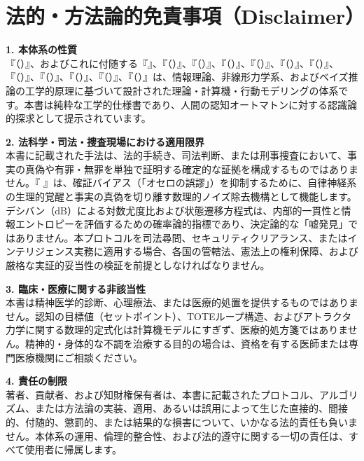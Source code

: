 \ifja
    \chapter*{法的・方法論的免責事項（Disclaimer）}
    \noindent
    \textbf{1. 本体系の性質}\\
    『\fullSNLP（\abbrSNLP）』、およびこれに付随する『\fullOthelloFilter』、『\fullOIP（\abbrOIP）』、『\fullBTP（\abbrBTP）』、『\fullBV（\abbrBV）』、『\fullBDLL（\abbrBDLL）』、『\fullSBFT（\abbrSBFT）』、『\fullTRPSH（\abbrTRPSH）』、『\fullBHPPP（\abbrBHPPP）』、『\fullUUSTT（\abbrUUSTT）』、『\fullRCSMIT（\abbrRCSMIT）』、『\fullFTHBFT（\abbrFTHBFT）』、『\fullMBCR（\abbrMBCR）』は、情報理論、非線形力学系、およびベイズ推論の工学的原理に基づいて設計された理論・計算機・行動モデリングの体系です。本書は純粋な工学的仕様書であり、人間の認知オートマトンに対する認識論的探求として提示されています。

    \vspace{0.8em}
    \noindent
    \textbf{2. 法科学・司法・捜査現場における適用限界}\\
    本書に記載された手法は、法的手続き、司法判断、または刑事捜査において、事実の真偽や有罪・無罪を単独で証明する確定的な証拠を構成するものではありません。『 \fullOthelloFilter 』は、確証バイアス（「オセロの誤謬」）を抑制するために、自律神経系の生理的覚醒と事実の真偽を切り離す数理的ノイズ除去機構として機能します。デシバン（$\text{dB}$）による対数尤度比および状態遷移方程式は、内部的一貫性と情報エントロピーを評価するための確率論的指標であり、決定論的な「嘘発見」ではありません。本プロトコルを司法尋問、セキュリティクリアランス、またはインテリジェンス実務に適用する場合、各国の管轄法、憲法上の権利保障、および厳格な実証的妥当性の検証を前提としなければなりません。

    \vspace{0.8em}
    \noindent
    \textbf{3. 臨床・医療に関する非該当性}\\
    本書は精神医学的診断、心理療法、または医療的処置を提供するものではありません。認知の目標値（セットポイント）、TOTEループ構造、およびアトラクタ力学に関する数理的定式化は計算機モデルにすぎず、医療的処方箋ではありません。精神的・身体的な不調を治療する目的の場合は、資格を有する医師または専門医療機関にご相談ください。

    \vspace{0.8em}
    \noindent
    \textbf{4. 責任の制限}\\
    著者、貢献者、および知財権保有者は、本書に記載されたプロトコル、アルゴリズム、または方法論の実装、適用、あるいは誤用によって生じた直接的、間接的、付随的、懲罰的、または結果的な損害について、いかなる法的責任も負いません。本体系の運用、倫理的整合性、および法的遵守に関する一切の責任は、すべて使用者に帰属します。

